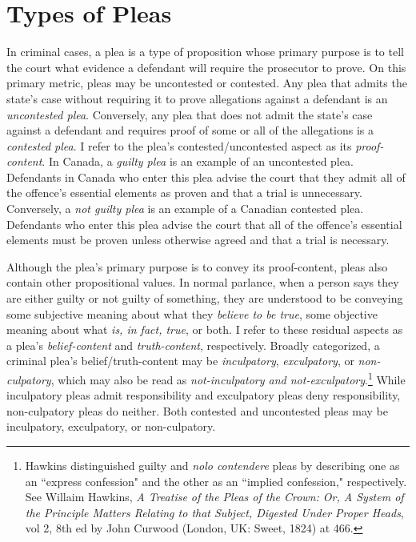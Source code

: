 \section{Types of Pleas}

In criminal cases, a plea is a type of proposition whose primary purpose is to tell the court what evidence a defendant will require the prosecutor to prove. On this primary metric, pleas may be uncontested or contested. Any plea that admits the state's case without requiring it to prove allegations against a defendant is an \textit{uncontested plea}. Conversely, any plea that does not admit the state's case against a defendant and requires proof of some or all of the allegations is a \textit{contested plea}. I refer to the plea's contested/uncontested aspect as its \textit{proof-content}. In Canada, a \textit{guilty plea} is an example of an uncontested plea. Defendants in Canada who enter this plea advise the court that they admit all of the offence's essential elements as proven and that a trial is unnecessary. Conversely, a \textit{not guilty plea} is an example of a Canadian contested plea. Defendants who enter this plea advise the court that all of the offence's essential elements must be proven unless otherwise agreed and that a trial is necessary.

Although the plea's primary purpose is to convey its proof-content, pleas also contain other propositional values. In normal parlance, when a person says they are either guilty or not guilty of something, they are understood to be conveying some subjective meaning about what they \textit{believe to be true}, some objective meaning about what \textit{is, in fact, true}, or both. I refer to these residual aspects as a plea's \textit{belief-content} and \textit{truth-content}, respectively. Broadly categorized, a criminal plea's belief/truth-content may be \textit{inculpatory}, \textit{exculpatory}, or \textit{non-culpatory}, which may also be read as \textit{not-inculpatory and not-exculpatory}.\footnote{Hawkins distinguished guilty and \textit{nolo contendere} pleas by describing one as an ``express confession" and the other as an ``implied confession," respectively. See Willaim Hawkins, \textit{A Treatise of the Pleas of the Crown: Or, A System of the Principle Matters Relating to that Subject, Digested Under Proper Heads}, vol 2, 8th ed by John Curwood (London, UK: Sweet, 1824) at 466.} While inculpatory pleas admit responsibility and exculpatory pleas deny responsibility, non-culpatory pleas do neither. Both contested and uncontested pleas may be inculpatory, exculpatory, or non-culpatory.
    
